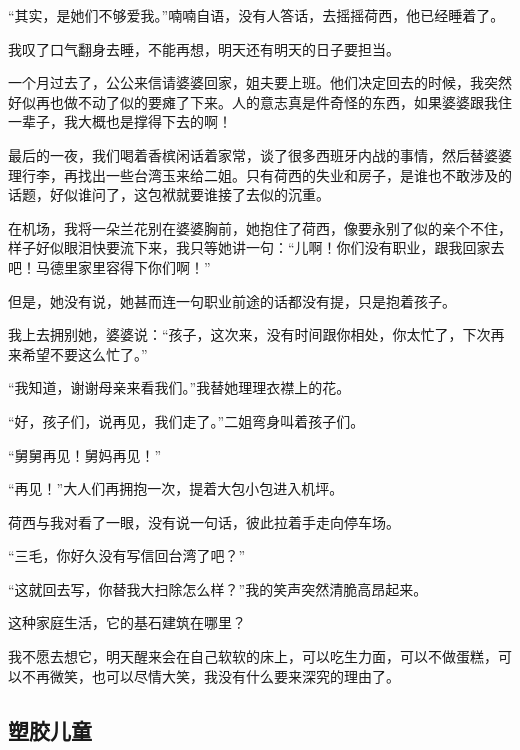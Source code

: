 \par “其实，是她们不够爱我。”喃喃自语，没有人答话，去摇摇荷西，他已经睡着了。
\par 我叹了口气翻身去睡，不能再想，明天还有明天的日子要担当。
\par 一个月过去了，公公来信请婆婆回家，姐夫要上班。他们决定回去的时候，我突然好似再也做不动了似的要瘫了下来。人的意志真是件奇怪的东西，如果婆婆跟我住一辈子，我大概也是撑得下去的啊！
\par 最后的一夜，我们喝着香槟闲话着家常，谈了很多西班牙内战的事情，然后替婆婆理行李，再找出一些台湾玉来给二姐。只有荷西的失业和房子，是谁也不敢涉及的话题，好似谁问了，这包袱就要谁接了去似的沉重。
\par 在机场，我将一朵兰花别在婆婆胸前，她抱住了荷西，像要永别了似的亲个不住，样子好似眼泪快要流下来，我只等她讲一句：“儿啊！你们没有职业，跟我回家去吧！马德里家里容得下你们啊！”
\par 但是，她没有说，她甚而连一句职业前途的话都没有提，只是抱着孩子。
\par 我上去拥别她，婆婆说：“孩子，这次来，没有时间跟你相处，你太忙了，下次再来希望不要这么忙了。”
\par “我知道，谢谢母亲来看我们。”我替她理理衣襟上的花。
\par “好，孩子们，说再见，我们走了。”二姐弯身叫着孩子们。
\par “舅舅再见！舅妈再见！”
\par “再见！”大人们再拥抱一次，提着大包小包进入机坪。
\par 荷西与我对看了一眼，没有说一句话，彼此拉着手走向停车场。
\par “三毛，你好久没有写信回台湾了吧？”
\par “这就回去写，你替我大扫除怎么样？”我的笑声突然清脆高昂起来。
\par 这种家庭生活，它的基石建筑在哪里？
\par 我不愿去想它，明天醒来会在自己软软的床上，可以吃生力面，可以不做蛋糕，可以不再微笑，也可以尽情大笑，我没有什么要来深究的理由了。


\subsection{塑胶儿童}

